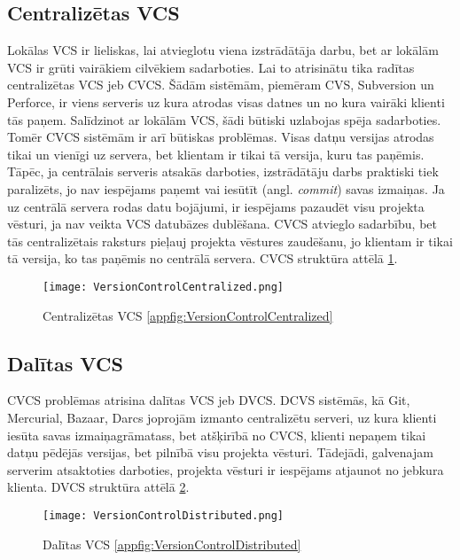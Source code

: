 \subsection{Centralizētas VCS}
Lokālas VCS ir lieliskas, lai atvieglotu viena izstrādātāja darbu, bet ar lokālām VCS ir grūti vairākiem cilvēkiem sadarboties. Lai to atrisinātu tika radītas centralizētas VCS jeb CVCS. Šādām sistēmām, piemēram CVS, Subversion un Perforce, ir viens serveris uz kura atrodas visas datnes un no kura vairāki klienti tās paņem. Salīdzinot ar lokālām VCS, šādi būtiski uzlabojas spēja sadarboties. Tomēr CVCS sistēmām ir arī būtiskas problēmas. Visas datņu versijas atrodas tikai un vienīgi uz servera, bet klientam ir tikai tā versija, kuru tas paņēmis. Tāpēc, ja centrālais serveris atsakās darboties, izstrādātāju darbs praktiski tiek paralizēts, jo nav iespējams paņemt vai iesūtīt (angl. \textit{commit}) savas izmaiņas. Ja uz centrālā servera rodas datu bojājumi, ir iespējams pazaudēt visu projekta vēsturi, ja nav veikta VCS datubāzes dublēšana.
CVCS atvieglo sadarbību, bet tās centralizētais raksturs pieļauj projekta vēstures zaudēšanu, jo klientam ir tikai tā versija, ko tas paņēmis no centrālā servera. CVCS struktūra attēlā \ref{fig:VersionControlCentralized}.
\begin{figure}[H]%
	\centering
	\captionsetup{justification=centering}
	\texttt{[image: VersionControlCentralized.png]}
	\caption{Centralizētas VCS \ref{appfig:VersionControlCentralized}}
	\label{fig:VersionControlCentralized}
\end{figure}

\subsection{Dalītas VCS}
CVCS problēmas atrisina dalītas VCS jeb DVCS. DCVS sistēmās, kā Git, Mercurial, Bazaar, Darcs joprojām izmanto centralizētu serveri, uz kura klienti iesūta savas izmaiņagrāmatass, bet atšķirībā no CVCS, klienti nepaņem tikai datņu pēdējās versijas, bet pilnībā visu projekta vēsturi. Tādejādi, galvenajam serverim atsaktoties darboties, projekta vēsturi ir iespējams atjaunot no jebkura klienta. DVCS struktūra attēlā \ref{fig:VersionControlDistributed}.
\begin{figure}[H]%
	\centering
	\captionsetup{justification=centering}
	\texttt{[image: VersionControlDistributed.png]}
	\caption{Dalītas VCS \ref{appfig:VersionControlDistributed}}
	\label{fig:VersionControlDistributed}
\end{figure}

